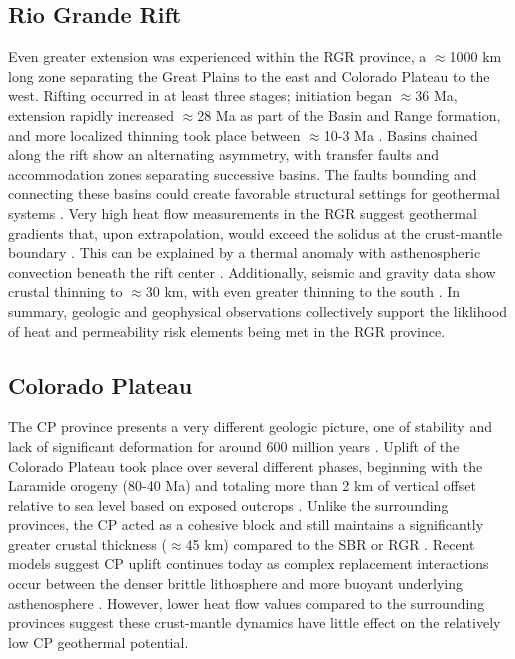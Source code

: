 \subsection{Rio Grande Rift}\label{ch2:rgr_province}
Even greater extension was experienced within the RGR province, a $\approx$1000 km long zone separating the Great Plains to the east and Colorado Plateau to the west. Rifting occurred in at least three stages; initiation began $\approx$36 Ma, extension rapidly increased $\approx$28 Ma as part of the Basin and Range formation, and more localized thinning took place between $\approx$10-3 Ma \citep{bielicki_hydrogeolgic_2015,mack_geology_2008,seager_new_1984}. Basins chained along the rift show an alternating asymmetry, with transfer faults and accommodation zones separating successive basins. The faults bounding and connecting these basins could create favorable structural settings for geothermal systems \citep{faulds_favorable_2015}. Very high heat flow measurements in the RGR suggest geothermal gradients that, upon extrapolation, would exceed the solidus at the crust-mantle boundary \citep{olsen_rio_1987}. This can be explained by a thermal anomaly with asthenospheric convection beneath the rift center \citep{olsen_rio_1987}. Additionally, seismic and gravity data show crustal thinning to $\approx$30 km, with even greater thinning to the south \citep{keller_rio_1999}. In summary, geologic and geophysical observations collectively support the liklihood of heat and permeability risk elements being met in the RGR province. 

\subsection{Colorado Plateau}\label{ch2:cp_province}
The CP province presents a very different geologic picture, one of stability and lack of significant deformation for around 600 million years \citep{leighty_neogene_1997}. Uplift of the Colorado Plateau took place over several different phases, beginning with the Laramide orogeny (80-40 Ma) and totaling more than 2 km of vertical offset relative to sea level based on exposed outcrops \citep{moucha_deep_2009}. Unlike the surrounding provinces, the CP acted as a cohesive block and still maintains a significantly greater crustal thickness ($\approx$45 km) compared to the SBR or RGR \citep{wilson_imaging_2005}. Recent models suggest CP uplift continues today as complex replacement interactions occur between the denser brittle lithosphere and more buoyant underlying asthenosphere \citep{levander_continuing_2011}. However, lower heat flow values compared to the surrounding provinces \citep{thompson_regional_1979} suggest these crust-mantle dynamics have little effect on the relatively low CP geothermal potential.


